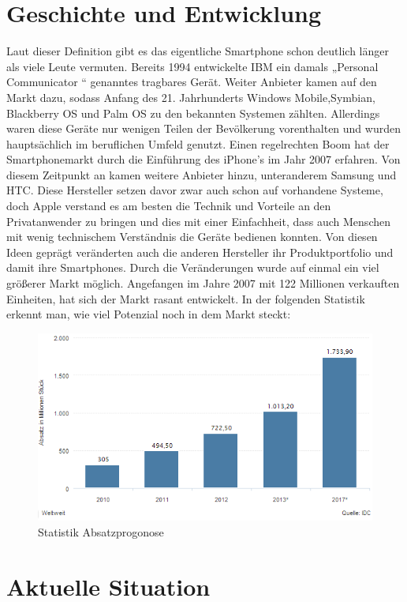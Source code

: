 \section{Geschichte und Entwicklung}

Laut dieser Definition gibt es das eigentliche Smartphone schon deutlich länger als viele Leute vermuten. Bereits 1994 entwickelte IBM ein damals „Personal Communicator “ genanntes tragbares Gerät. Weiter Anbieter kamen auf den Markt dazu, sodass Anfang des 21. Jahrhunderts Windows Mobile,Symbian, Blackberry OS und Palm OS zu den bekannten Systemen zählten. Allerdings waren diese Geräte nur wenigen Teilen der Bevölkerung vorenthalten  und wurden hauptsächlich im beruflichen Umfeld genutzt. Einen regelrechten Boom hat der Smartphonemarkt durch die Einführung des iPhone’s im Jahr 2007 erfahren. Von diesem Zeitpunkt an kamen weitere Anbieter hinzu, unteranderem Samsung und HTC. Diese Hersteller setzen davor zwar auch schon auf vorhandene Systeme, doch Apple verstand es am besten die Technik und Vorteile an den Privatanwender zu bringen und dies mit einer Einfachheit, dass auch Menschen mit wenig technischem Verständnis die Geräte bedienen konnten. Von diesen Ideen geprägt veränderten auch die anderen Hersteller ihr Produktportfolio und damit ihre Smartphones. Durch die Veränderungen wurde auf einmal ein viel größerer Markt möglich. Angefangen im Jahre 2007 mit 122 Millionen verkauften Einheiten, hat sich der Markt rasant entwickelt. In der folgenden Statistik erkennt man, wie viel Potenzial noch in dem Markt steckt: 

\begin{figure}[H]
\centering
\includegraphics[width=0.7\linewidth]{../images/statista1.png}
\caption{Statistik Absatzprogonose}
\label{fig:statista1}
\end{figure}

\section{Aktuelle Situation}

